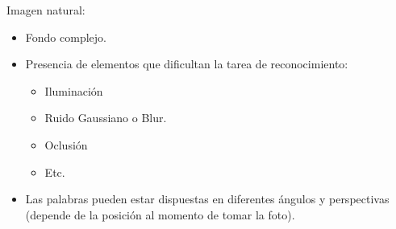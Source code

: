 		\begin{frame}
			Imagen natural:
			\begin{itemize}
				\item Fondo complejo.
				\item Presencia de elementos que dificultan la tarea de reconocimiento:
				\begin{itemize}
					\item Iluminación
					\item Ruido Gaussiano o Blur.
					\item Oclusión
					\item Etc.
				\end{itemize}
				\item Las palabras pueden estar dispuestas en diferentes ángulos y perspectivas (depende de la posición al momento de tomar la foto).
			\end{itemize}
		\end{frame}
